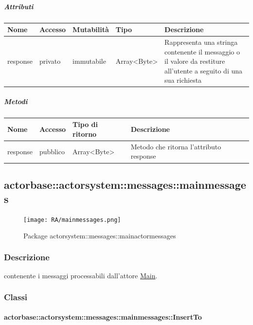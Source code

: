 \documentclass{scalatekids-article}
\begin{document}
\subparagraph{Attributi}
\begin{tabular}{| p{2cm} | p{1.5cm} | p{2cm} | p{3cm} | p{8.5cm} |}
  \hline
  Nome & Accesso & Mutabilità & Tipo & Descrizione\\
  \hline
  response & privato & immutabile & Array<Byte> & Rappresenta una stringa contenente il messaggio o il valore da restiture all'utente a seguito di una sua richiesta\\
  \hline
\end{tabular}

\subparagraph{Metodi}
\begin{tabular}{| p{3cm} | p{1.5cm} | p{3.5cm} | p{9cm} |}
  \hline
  Nome & Accesso & Tipo di ritorno & Descrizione\\
  \hline
  response & pubblico & Array<Byte> & Metodo che ritorna l'attributo response\\
  \hline
\end{tabular}


\subsection{actorbase::actorsystem::messages::mainmessages}
\label{sec:actorbase::actorsystem::messages::mainmessages}

\begin{figure}[H]
  \begin{center}
    \texttt{[image: RA/mainmessages.png]}
    \caption{Package actorsystem::messages::mainactormessages}
  \end{center}
\end{figure}

\subsubsection{Descrizione}
 contenente i messaggi processabili dall'attore \hyperref[sec:actorbase::actorsystem::actors::main::Main]{Main}.

\subsubsection{Classi}

\paragraph{actorbase::actorsystem::messages::mainmessages::InsertTo}
\label{sec:actorbase::actorsystem::messages::mainmessages::InsertTo}
\end{document}
